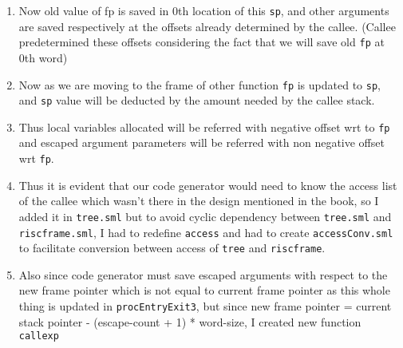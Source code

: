 \begin{enumerate}
\begin{enumerate}
  \item
    Now old value of fp is saved in 0th location of this
    \texttt{sp},
    and other arguments are saved respectively at the offsets already
    determined by the callee. (Callee predetermined these offsets
    considering the fact that we will save old
    \texttt{fp}
    at 0th word)
  \item
    Now as we are moving to the frame of other function
    \texttt{fp}
    is updated to
    \texttt{sp},
    and
    \texttt{sp}
    value will be deducted by the amount needed by the callee stack.
  \item
    Thus local variables allocated will be referred with negative offset
    wrt to
    \texttt{fp}
    and escaped argument parameters will be referred with non negative
    offset wrt
    \texttt{fp}.
  \item
    Thus it is evident that our code generator would need to know the
    access list of the callee which wasn't there in the design mentioned
    in the book, so I added it in
    \texttt{tree.sml}
    but to avoid cyclic dependency between
    \texttt{tree.sml}
    and
    \texttt{riscframe.sml},
    I had to redefine
    \texttt{access}
    and had to create
    \texttt{accessConv.sml}
    to facilitate conversion between access of
    \texttt{tree}
    and
    \texttt{riscframe}.
  \item
    Also since code generator must save escaped arguments with respect
    to the new frame pointer which is not equal to current frame pointer
    as this whole thing is updated in
    \texttt{procEntryExit3},
    but since new frame pointer = current stack pointer - (escape-count
    + 1) * word-size, I created new function
    \texttt{callexp}

\end{enumerate}
\end{enumerate}

